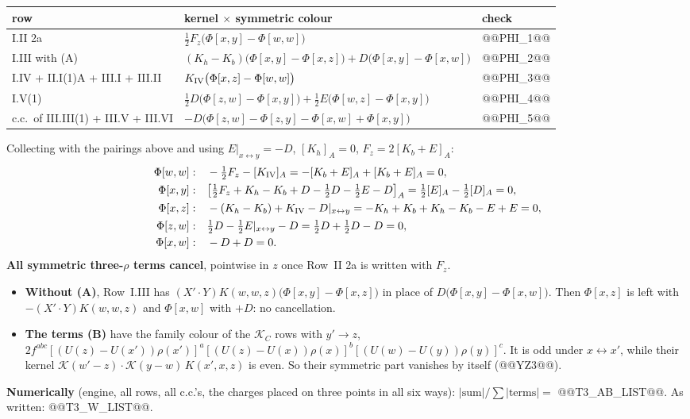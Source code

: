 \documentclass[10pt]{article}
\numberwithin{equation}{section}
\newcommand{\KK}{\mathcal K}
\begin{document}
\begin{center}\small
\renewcommand{\arraystretch}{1.3}
\begin{tabular}{@{}lll@{}}\toprule
row & kernel $\times$ symmetric colour & check\\\midrule
I.II 2a & $\frac12F_z\big(\Phi[x,y]-\Phi[w,w]\big)$ & @@PHI_1@@\\
I.III with (A) & $(K_h-K_b)\big(\Phi[x,y]-\Phi[x,z]\big)+D\big(\Phi[x,y]-\Phi[x,w]\big)$ & @@PHI_2@@\\
I.IV + II.I(1)A + III.I + III.II & $K_{\rm IV}\big(\Phi[x,z]-\Phi[w,w]\big)$ & @@PHI_3@@\\
I.V(1) & $\frac12D\big(\Phi[z,w]-\Phi[x,y]\big)+\frac12E\big(\Phi[w,z]-\Phi[x,y]\big)$ & @@PHI_4@@\\
c.c.\ of III.III(1) + III.V + III.VI & $-D\big(\Phi[z,w]-\Phi[z,y]-\Phi[x,w]+\Phi[x,y]\big)$ & @@PHI_5@@\\\bottomrule
\end{tabular}
\end{center}
Collecting with the pairings above and using $E|_{x\leftrightarrow y}=-D$, $[K_h]_A=0$, $F_z=2[K_b+E]_A$:
\begin{align*}
\Phi[w,w]:&\quad -\tfrac12F_z-[K_{\rm IV}]_A=-[K_b+E]_A+[K_b+E]_A=0,\\
\Phi[x,y]:&\quad \big[\tfrac12F_z+K_h-K_b+D-\tfrac12D-\tfrac12E-D\big]_A=\tfrac12[E]_A-\tfrac12[D]_A=0,\\
\Phi[x,z]:&\quad -(K_h-K_b)+K_{\rm IV}-D|_{x\leftrightarrow y}=-K_h+K_b+K_h-K_b-E+E=0,\\
\Phi[z,w]:&\quad \tfrac12D-\tfrac12E|_{x\leftrightarrow y}-D=\tfrac12D+\tfrac12D-D=0,\\
\Phi[x,w]:&\quad -D+D=0.
\end{align*}
\textbf{All symmetric three-$\rho$ terms cancel}, pointwise in $z$ once Row~II 2a is written with $F_z$.
\begin{itemize}
\item \textbf{Without (A)}, Row~I.III has $(X'\!\cdot Y)K(w,w,z)\big(\Phi[x,y]-\Phi[x,z]\big)$ in place of $D\big(\Phi[x,y]-\Phi[x,w]\big)$. Then $\Phi[x,z]$ is left with $-(X'\!\cdot Y)K(w,w,z)$ and $\Phi[x,w]$ with $+D$: no cancellation.
\item \textbf{The terms (B)} have the family colour of the $\KK_C$ rows with $y'\to z$, $2f^{abc}[(U(z)-U(x'))\rho(x')]^a[(U(z)-U(x))\rho(x)]^b[(U(w)-U(y))\rho(y)]^c$. It is odd under $x\leftrightarrow x'$, while their kernel $\KK(w'-z)\cdot\KK(y-w)\,K(x',x,z)$ is even. So their symmetric part vanishes by itself (@@YZ3@@).
\end{itemize}
\textbf{Numerically} (engine, all rows, all c.c.'s, the charges placed on three points in all six ways): $|\text{sum}|/\sum|\text{terms}|=$ @@T3_AB_LIST@@. As written: @@T3_W_LIST@@.
\end{document}
